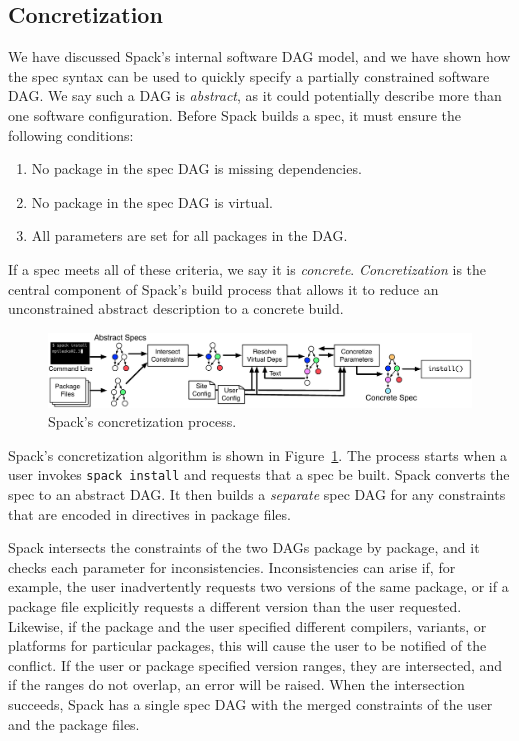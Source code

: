 
\subsection{Concretization}

We have discussed Spack's internal software DAG model, and we have shown
how the spec syntax can be used to quickly specify a partially constrained
software DAG.  We say such a DAG is {\it abstract}, as it could potentially
describe more than one software configuration. Before Spack builds a spec, it
must ensure the following conditions:
\begin{enumerate}
\item No package in the spec DAG is missing dependencies.
\item No package in the spec DAG is virtual.
\item All parameters are set for all packages in the DAG.
\end{enumerate}
If a spec meets all of these criteria, we say it is {\it concrete}.
{\it Concretization} is the central component of Spack's build
process that allows it to reduce an unconstrained abstract
description to a concrete build.

\begin{figure}
	\centering
	\includegraphics[width=\textwidth]{figs/concretization.pdf}
	\caption{
		Spack's concretization process.
		\label{fig:concretization}
	}
\end{figure}

Spack's concretization algorithm is shown in Figure~\ref{fig:concretization}.
The process starts when a user invokes {\tt spack install} and requests that a
spec be built.  Spack converts the spec to an abstract DAG.
It then builds a {\it separate} spec DAG for any constraints that are encoded
in directives in package files.

Spack intersects the constraints of the two DAGs package by package, and it
checks each parameter for inconsistencies.  Inconsistencies can arise if, for example,
the user inadvertently requests two versions of the same package, or if a
package file explicitly requests a different version than the user requested.
Likewise, if the package and the user specified different compilers, variants,
or platforms for particular packages, this will cause the user to be notified
of the conflict. If the user or package specified version ranges, they are
intersected, and if the ranges do not overlap, an error will be raised.
When the intersection succeeds, Spack has a single spec DAG with the merged
constraints of the user and the package files.

